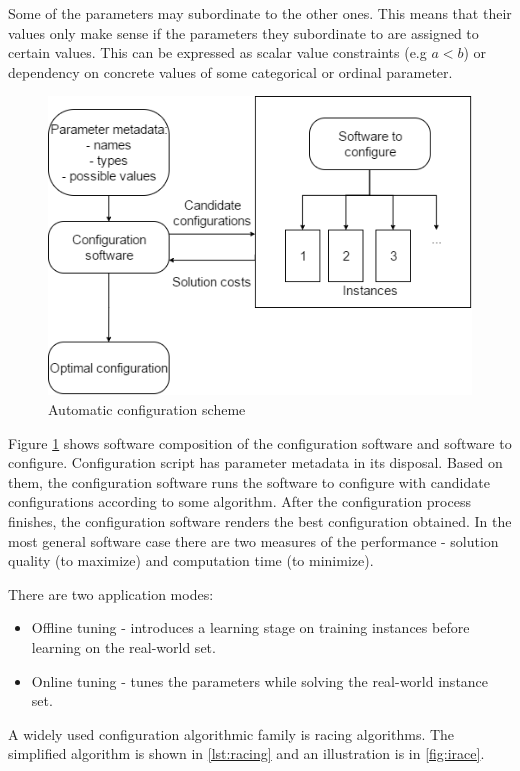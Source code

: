 \documentclass[12pt]{article}
\begin{document}
Some of the parameters may subordinate to the other ones. This means that their values only make sense if the parameters they subordinate to are assigned to certain values. This can be expressed as scalar value constraints (e.g $a < b$) or dependency on concrete values of some categorical or ordinal parameter.

\begin{figure}[H]
  \centering
    \includegraphics[scale=0.7]{configuration-top-level.png}
  \caption{Automatic configuration scheme}
  \label{fig:autoconf}
\end{figure}

Figure \ref{fig:autoconf} shows software composition of the configuration software and software to configure. Configuration script has parameter metadata in its disposal. Based on them, the configuration software runs the software to configure with candidate configurations according to some algorithm. After the configuration process finishes, the configuration software renders the best configuration obtained. In the most general software case there are two measures of the performance - solution quality (to maximize) and computation time (to minimize).

There are two application modes:
\begin{itemize}
\item Offline tuning - introduces a learning stage on training instances before learning on the real-world set.
\item Online tuning - tunes the parameters while solving the real-world instance set.
\end{itemize}

A widely used configuration algorithmic family is racing algorithms. The simplified algorithm is shown in \ref{lst:racing} and an illustration is in \ref{fig:irace}.
\end{document}

